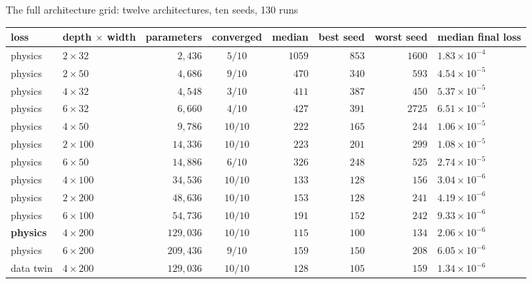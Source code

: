 \documentclass[aspectratio=169,10pt]{beamer}
\newcommand{\hl}[1]{{\color{accent}\textbf{#1}}}
\begin{document}
\begin{frame}[shrink=25]{The full architecture grid: twelve architectures, ten seeds, 130 runs}
  \vspace{1mm}
  \centering\footnotesize
  \begin{tabular}{@{}llrcrrrl@{}}
    \toprule
    loss & depth $\times$ width & parameters & converged & median & best seed & worst seed & median final loss \\
    \midrule
    physics & $2 \times 32$  & $2{,}436$   & $5/10$  & $1059$ & $853$ & $1600$ & $1.83\times10^{-4}$ \\
    physics & $2 \times 50$  & $4{,}686$   & $9/10$  & $470$  & $340$ & $593$  & $4.54\times10^{-5}$ \\
    physics & $4 \times 32$  & $4{,}548$   & $3/10$  & $411$  & $387$ & $450$  & $5.37\times10^{-5}$ \\
    physics & $6 \times 32$  & $6{,}660$   & $4/10$  & $427$  & $391$ & $2725$ & $6.51\times10^{-5}$ \\
    physics & $4 \times 50$  & $9{,}786$   & $10/10$ & $222$  & $165$ & $244$  & $1.06\times10^{-5}$ \\
    physics & $2 \times 100$ & $14{,}336$  & $10/10$ & $223$  & $201$ & $299$  & $1.08\times10^{-5}$ \\
    physics & $6 \times 50$  & $14{,}886$  & $6/10$  & $326$  & $248$ & $525$  & $2.74\times10^{-5}$ \\
    physics & $4 \times 100$ & $34{,}536$  & $10/10$ & $133$  & $128$ & $156$  & $3.04\times10^{-6}$ \\
    physics & $2 \times 200$ & $48{,}636$  & $10/10$ & $153$  & $128$ & $241$  & $4.19\times10^{-6}$ \\
    physics & $6 \times 100$ & $54{,}736$  & $10/10$ & $191$  & $152$ & $242$  & $9.33\times10^{-6}$ \\
    \hl{physics} & \hl{$4 \times 200$} & $129{,}036$ & $10/10$ & \hl{$115$}  & $100$ & $134$  & $2.06\times10^{-6}$ \\
    physics & $6 \times 200$ & $209{,}436$ & $9/10$  & $159$  & $150$ & $208$  & $6.05\times10^{-6}$ \\
    \midrule
    data twin & $4 \times 200$ & $129{,}036$ & $10/10$ & $128$ & $105$ & $159$ & $1.34\times10^{-6}$ \\
    \bottomrule
  \end{tabular}
  \vspace{2mm}


\end{frame}
\end{document}

